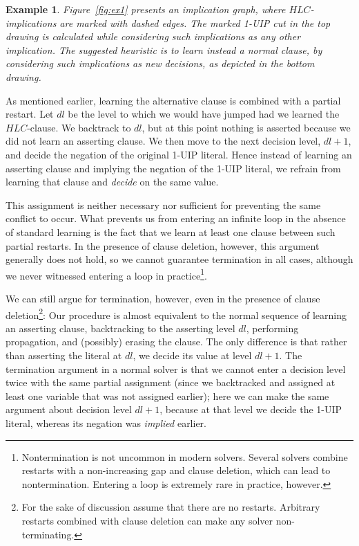 \documentclass[twoside,11pt]{article}
\newcommand\qed{\hfill\hbox{\hskip 4pt
                \vrule width 3pt height 1pt depth 1pt
                \hbox{\vrule width 2pt height 3.5pt depth 1pt}}}
\newtheorem{example}{Example}
\begin{document}

\begin{example} \label{ex:1}
Figure~\ref{fig:ex1} presents an implication graph, where $HLC$-implications
are marked with dashed edges. The marked 1-UIP cut in the top drawing is calculated while considering such
implications as any other implication. The suggested heuristic is to learn instead a normal clause, by considering such implications as
new decisions, as depicted in the bottom drawing.
\qed
\end{example}


As mentioned earlier, learning the alternative clause is combined with a partial restart. Let $dl$ be the level to which we would have jumped had we learned  the $HLC$-clause. We backtrack to $dl$, but at this point nothing is asserted because we did not learn an asserting clause. We then move to the next decision level, $dl+1$, and decide the negation of the original 1-UIP literal.
Hence instead of learning an asserting clause and implying the negation of
the 1-UIP literal, we refrain from learning that clause and \emph{decide} on the
same value.

This assignment is neither necessary nor sufficient for
preventing the same conflict to occur.
What prevents us from entering an
infinite loop in the absence of standard learning is the fact that we learn
at least one clause between such partial restarts. In the presence of clause deletion, however, this argument generally does not hold, so we cannot guarantee termination in all cases, although we never witnessed entering a loop in practice\footnote{Nontermination is not uncommon in modern solvers. Several solvers combine restarts with a non-increasing gap and clause deletion, which can lead to nontermination. Entering a loop is extremely rare in practice, however.}.


We can still argue for termination, however, even in the presence of clause deletion\footnote{For the sake of discussion assume that there are no restarts. Arbitrary restarts combined with clause deletion can make any solver non-terminating.}: Our procedure is almost equivalent to the normal sequence of learning an asserting clause, backtracking to the asserting level $dl$, performing propagation, and (possibly) erasing the clause. The only difference is that rather than asserting the literal at $dl$, we decide its value at level $dl+1$. The termination argument in a normal solver is that we cannot enter a decision level twice with the same partial assignment (since we backtracked and assigned at least one variable that was not assigned earlier); here we can make the same argument about decision level $dl+1$, because at that level we decide the 1-UIP literal, whereas its negation was \emph{implied} earlier.
\end{document}

